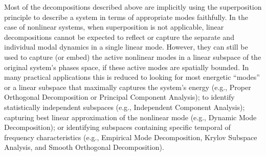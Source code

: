 \documentclass[10pt]{article}
\begin{document}
Most of the decompositions described above are implicitly using the superposition principle to describe a system in terms of appropriate modes faithfully.
In the case of nonlinear systems, when superposition is not applicable, linear decompositions cannot be expected to reflect or capture the separate and individual modal dynamics in a single linear mode.
However, they can still be used to capture (or embed) the active nonlinear modes in a linear subspace of the original system's phases space, if these active modes are spatially bounded.
In many practical applications this is reduced to looking for most energetic ``modes'' or a linear subspace that maximally captures the system's energy (e.g., Proper Orthogonal Decomposition or Principal Component Analysis); to identify statistically independent subspaces (e.g., Independent Component Analysis); capturing best linear approximation of the nonlinear mode (e.g., Dynamic Mode Decomposition); or identifying subspaces containing specific temporal of frequency characteristics (e.g., Empirical Mode Decomposition, Krylov Subspace Analysis, and Smooth Orthogonal Decomposition).

\end{document}
